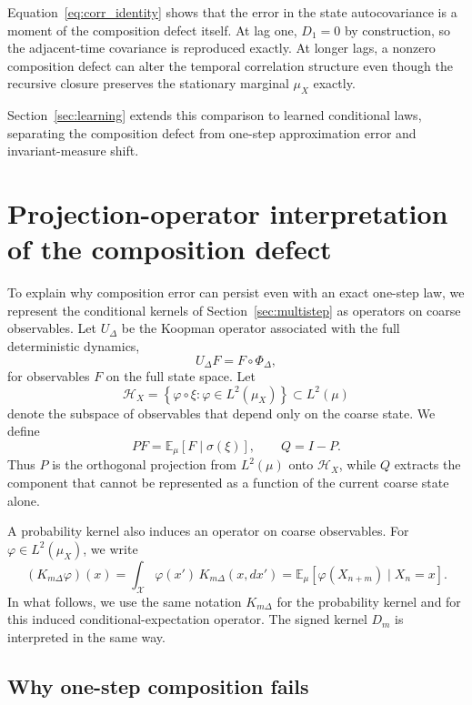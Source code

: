 \documentclass[final,hidelinks]{siamart251216}
\newcommand{\cX}{\mathcal{X}}
\newcommand{\E}{\mathbb{E}}
\begin{document}
Equation~\eqref{eq:corr_identity} shows that the error in the state
autocovariance is a moment of the composition defect itself. At lag one, $D_1=0$ by construction, so the adjacent-time covariance is
reproduced exactly. At longer lags, a nonzero composition defect can alter
the temporal correlation structure even though the recursive closure
preserves the stationary marginal $\mu_X$ exactly.

Section~\ref{sec:learning} extends this comparison to learned conditional
laws, separating the composition defect from one-step approximation error
and invariant-measure shift.

\section{Projection-operator interpretation of the composition defect}
\label{sec:projection}

To explain why composition error can persist even with an exact one-step law, we represent the conditional kernels of Section~\ref{sec:multistep} as operators on coarse observables. Let $U_\Delta$ be the Koopman operator associated with the full deterministic
dynamics,
\begin{equation}
    U_\Delta F=F\circ\Phi_\Delta,
    \label{eq:koopman}
\end{equation}
for observables $F$ on the full state space.  Let
\[
    \mathcal H_X
    =
    \left\{
        \varphi\circ\xi:
        \varphi\in L^2(\mu_X)
    \right\}
    \subset L^2(\mu)
\]
denote the subspace of observables that depend only on the coarse state.
We define
\begin{equation}
    PF=\E_\mu[F\mid \sigma(\xi)],
    \qquad
    Q=I-P.
    \label{eq:PQ}
\end{equation}
Thus $P$ is the orthogonal projection from $L^2(\mu)$ onto
$\mathcal H_X$, while $Q$ extracts the component that cannot be represented
as a function of the current coarse state alone.

A probability kernel also induces an operator on coarse observables.  For
$\varphi\in L^2(\mu_X)$, we write
\[
    (K_{m\Delta}\varphi)(x)
    =
    \int_{\cX}
    \varphi(x')\,K_{m\Delta}(x,dx')
    =
    \E_\mu[
        \varphi(X_{n+m})
        \mid X_n=x
    ].
\]
In what follows, we use the same notation $K_{m\Delta}$ for the probability
kernel and for this induced conditional-expectation operator.  The signed
kernel $D_m$ is interpreted in the same way.

\subsection{Why one-step composition fails}
\end{document}

